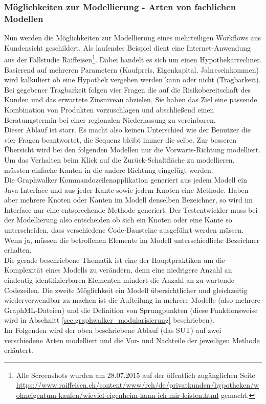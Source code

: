 \subsubsection{Möglichkeiten zur Modellierung - Arten von fachlichen Modellen}
\label{sec:results_modellierung}
Nun werden die Möglichkeiten zur Modellierung eines mehrteiligen Workflows aus Kundensicht geschildert. Als laufendes Beispiel dient eine Internet-Anwendung aus der Fallstudie Raiffeisen\footnote{Alle Screenshots wurden am 28.07.2015 auf der öffentlich zugänglichen Seite \url{https://www.raiffeisen.ch/content/www/rch/de/privatkunden/hypotheken/wohneigentum-kaufen/wieviel-eigenheim-kann-ich-mir-leisten.html} gemacht.}. Dabei handelt es sich um einen Hypothekarrechner.\\
Basierend auf mehreren Parametern (Kaufpreis, Eigenkapital, Jahreseinkommen) wird kalkuliert ob eine Hypothek vergeben werden kann oder nicht (Tragbarkeit). Bei gegebener Tragbarkeit folgen vier Fragen die auf die Risikobereitschaft des Kunden und das erwartete Zinsniveau abzielen. Sie haben das Ziel eine passende Kombination von Produkten vorzuschlagen und abschließend einen Beratungstermin bei einer regionalen Niederlassung zu vereinbaren.\\
Dieser Ablauf ist starr. Es macht also keinen Unterschied wie der Benutzer die vier Fragen beantwortet, die Sequenz bleibt immer die selbe. Zur besseren Übersicht wird bei den folgenden Modellen nur die Vorwärts-Richtung modelliert. Um das Verhalten beim Klick auf die Zurück-Schaltfläche zu modellieren, müssten einfache Kanten in die andere Richtung eingefügt werden.\\
Die Graphwalker Kommandozeilenapplikation generiert aus jedem Modell ein Java-Interface und aus jeder Kante sowie jedem Knoten eine Methode. Haben aber mehrere Knoten oder Kanten im Modell denselben Bezeichner, so wird im Interface nur eine entsprechende Methode generiert. Der Testentwickler muss bei der Modellierung also entscheiden ob sich ein Knoten oder eine Kante so unterscheiden, dass verschiedene Code-Bausteine ausgeführt werden müssen. Wenn ja, müssen die betroffenen Elemente im Modell unterschiedliche Bezeichner erhalten.\\
Die gerade beschriebene Thematik ist eine der Hauptpraktiken um die Komplexität eines Modells zu verändern, denn eine niedrigere Anzahl an eindeutig identifizierbaren Elementen mindert die Anzahl an zu wartende Codezeilen. Die zweite Möglichkeit ein Modell übersichtlicher und gleichzeitig wiederverwendbar zu machen ist die Aufteilung in mehrere Modelle (also mehrere GraphML-Dateien) und die Definition von Sprungpunkten (diese Funktionsweise wird in Abschnitt \ref{sec:graphwalker_modularisierung} beschrieben).\\
Im Folgenden wird der oben beschriebene Ablauf (das SUT) auf zwei verschiedene Arten modelliert und die Vor- und Nachteile der jeweiligen Methode erläutert.


